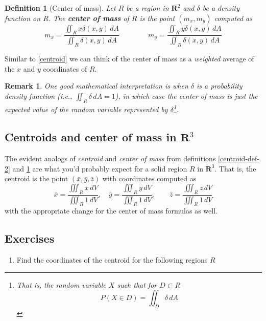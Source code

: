 \documentclass[12pt]{article}
\numberwithin{equation}{subsection}
\numberwithin{figure}{subsection}
\newtheorem{defn}[subsection]{Definition}
\theoremstyle{note}
\newtheorem{remark}[subsection]{Remark}
\begin{document}
{\begin{defn}[Center of mass]Let $R$ be a region in $\mathbf{R}^2$ and $\delta$ be a density function on $R$. The \textbf{center of mass} of $R$ is the point $(m_x,m_y)$ computed as \begin{equation}
	\label{com} m_x =\dfrac{\displaystyle \iint_R x \delta(x,y) \,dA}{\displaystyle \iint_R \delta(x,y)\,dA} \qquad \qquad m_y =\dfrac{\displaystyle \iint_R y \delta(x,y) \,dA}{\displaystyle \iint_R \delta(x,y)\,dA}
\end{equation}\label{com-def-2}
\end{defn}
Similar to \eqref{centroid} we can think of the center of mass as a \textit{weighted} average of the $x$ and $y$ coordinates of $R$. 

\begin{remark}One good mathematical interpretation is when $\delta$ is a probability density function (i.e., $\iint_R \delta\,dA=1$), in which case the center of mass is just the \textit{expected value} of the random variable represented by $\delta$\footnote{That is, the random variable $X$ such that for  $D\subset R$ \[P(X\in D)= \iint_D \delta \,dA\]}. \end{remark}

\subsection{Centroids and center of mass in $\mathbf{R}^3$}
The evident analogs of \textit{centroid} and \textit{center of mass} from definitions \ref{centroid-def-2} and \ref{com-def-2} are what you'd probably expect for a solid region $R$ in $\mathbf{R}^3$. That is, the centroid is the point $(\bar{x},\bar{y},\bar{z})$ with coordinates computed as \begin{equation} \bar{x} =\dfrac{\iiint_R x\,dV}{\iiint_R 1\,dV}, \quad \bar{y} =\dfrac{\iiint_R y\,dV}{\iiint_R 1\,dV}, \qquad \bar{z} =\dfrac{\iiint_R z\,dV}{\iiint_R 1\,dV} \end{equation}
with the appropriate change for the center of mass formulas as well. 

\subsection{Exercises}
\begin{enumerate}[label=\arabic*.]
\item Find the coordinates of the centroid for the following regions $R$


\end{enumerate}}
\end{document}
